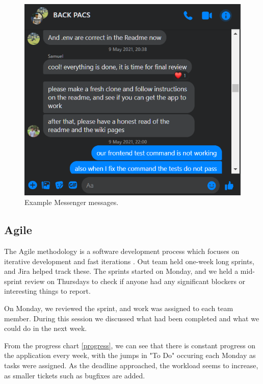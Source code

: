 \documentclass[conference]{IEEEtran}
\begin{document}
\begin{figure}[htbp]
\centerline{\includegraphics[width = \linewidth]{messenger.png}}
\caption{Example Messenger messages.}
\label{messenger}
\end{figure}

\subsection{Agile}
The Agile methodology is a software development process which focuses on iterative development and fast iterations \cite{b2}. Out team held one-week long sprints, and Jira helped track these. The sprints started on Monday, and we held a mid-sprint review on Thursdays to check if anyone had any significant blockers or interesting things to report.

On Monday, we reviewed the sprint, and work was assigned to each team member. During this session we discussed what had been completed and what we could do in the next week. 

From the progress chart \ref{progress}, we can see that there is constant progress on the application every week, with the jumps in "To Do" occuring each Monday as tasks were assigned. As the deadline approached, the workload seems to increase, as smaller tickets such as bugfixes are added.
\end{document}

